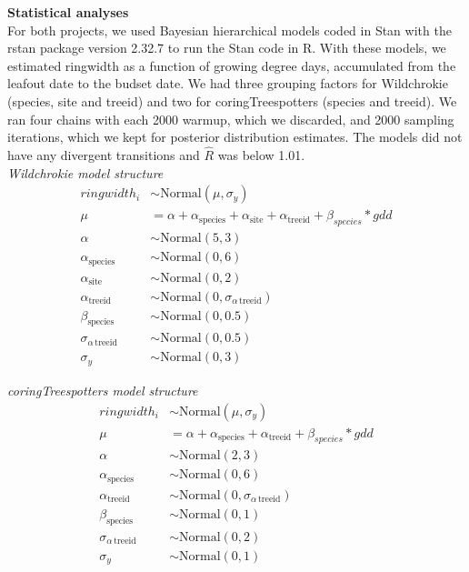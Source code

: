 \documentclass{article}
\begin{document}
\textbf{Statistical analyses} \\
For both projects, we used Bayesian hierarchical models coded in Stan with the rstan package version 2.32.7 \citep{carpenter_stan_2017} to run the Stan code in R. With these models, we estimated ringwidth as a function of growing degree days, accumulated from the leafout date to the budset date. We had three grouping factors for Wildchrokie (species, site and treeid) and two for coringTreespotters (species and treeid). We ran four chains with each 2000 warmup, which we discarded, and 2000 sampling iterations, which we kept for posterior distribution estimates. The models did not have any divergent transitions and $\hat{R}$ was below 1.01. \\

\textit{Wildchrokie model structure}
\[
\begin{aligned}
ringwidth_i &\sim \text{Normal}(\mu, \sigma_y) \\
\mu &= \alpha + \alpha_{\text{species}} + \alpha_{\text{site}} + \alpha_{\text{treeid}} + \beta_{species}* gdd \\
\alpha &\sim \text{Normal}(5, 3) \\
\alpha_{\text{species}} &\sim \text{Normal}(0, 6) \\
\alpha_{\text{site}} &\sim \text{Normal}(0, 2) \\
\alpha_{\text{treeid}} &\sim \text{Normal}(0, \sigma_{\alpha \, \text{treeid}}) \\
\beta_{\text{species}} &\sim \text{Normal}(0, 0.5) \\
\sigma_{\alpha \, \text{treeid}} & \sim \text{Normal}(0, 0.5) \\
\sigma_y & \sim \text{Normal}(0, 3)
\end{aligned}
\]

\textit{coringTreespotters model structure}
\[
\begin{aligned}
ringwidth_i &\sim \text{Normal}(\mu, \sigma_y) \\
\mu &= \alpha + \alpha_{\text{species}} + \alpha_{\text{treeid}} + \beta_{species}* gdd \\
\alpha &\sim \text{Normal}(2, 3) \\
\alpha_{\text{species}} &\sim \text{Normal}(0, 6) \\
\alpha_{\text{treeid}} &\sim \text{Normal}(0, \sigma_{\alpha \, \text{treeid}}) \\
\beta_{\text{species}} &\sim \text{Normal}(0, 1) \\
\sigma_{\alpha \, \text{treeid}} & \sim \text{Normal}(0, 2) \\
\sigma_y & \sim \text{Normal}(0, 1)
\end{aligned}
\]
\end{document}

